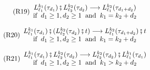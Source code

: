 \documentclass[12pt, a4paper]{article}
\newcommand{\layer}[3]{L^{\smash{#1}}_{\smash{#2}}(#3)}
\begin{document}
\begin{figure}[h]
{\begin{minipage}{0.982\linewidth}
\begin{center}
        \vspace{-0.5em}
        \hspace{-0.8em}
        \begin{subfigure}{0.55\textwidth}
            \begin{equation}\label{ru:swap:layerfus}\tag{R19}
                \begin{array}{c}
                    \layer{k_1}{\ell_1}{\tau_{d_1}}\fatsemi\layer{k_2}{\ell_2}{\tau_{d_2}} \longrightarrow \layer{k_2}{\ell_1}{\tau_{d_1+d_2}} \\
                    \text{if}\;\; d_1\ge1,d_2\ge1 \;\;\text{and}\;\; k_1=k_2+d_2
                \end{array}
            \end{equation}
        \end{subfigure}

        \vspace{-0.5em}
        \hspace{-0.8em}
        \begin{subfigure}{0.63\textwidth}
            \begin{equation}\label{ru:swap:layerfusctx}\tag{R20}
                \begin{array}{c}
                    \layer{k_1}{\ell_1}{\tau_{d_1}}\fatsemi (\layer{k_2}{\ell_2}{\tau_{d_2}}\fatsemi t) \longrightarrow \layer{k_2}{\ell_1}{\tau_{d_1+d_2}}\fatsemi t \\
                    \text{if}\;\; d_1\ge1,d_2\ge1 \;\;\text{and}\;\; k_1=k_2+d_2
                \end{array}
            \end{equation}
        \end{subfigure}

        \vspace{-0.5em}
        \hspace{-0.8em}
        \begin{subfigure}{0.63\textwidth}
            \begin{equation}\label{ru:swap:layercom}\tag{R21}
                \begin{array}{c}
                    \layer{k_1}{\ell_1}{\tau_{d_1}}\fatsemi\layer{k_2}{\ell_2}{\tau_{d_2}} \longrightarrow \layer{k_2}{\ell_2}{\tau_{d_2}}\fatsemi \layer{k_1}{\ell_1}{\tau_{d_1}} \\
                    \text{if}\;\; d_1\ge1,d_2\ge1 \;\;\text{and}\;\; k_1>k_2+d_2
                \end{array}
            \end{equation}
        \end{subfigure}


\end{center}
\end{minipage}}
\end{figure}
\end{document}
